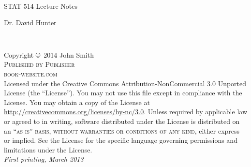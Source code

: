\documentclass[11pt,fleqn]{book} %
\begin{document}

\begingroup
\thispagestyle{empty}
\centering
\vspace*{9cm}
\par\normalfont\fontsize{35}{35}\sffamily\selectfont
STAT 514 Lecture Notes\par %
\vspace*{1cm}
{\Huge Dr. David Hunter}\par %
\endgroup


\newpage
~\vfill
\thispagestyle{empty}

\noindent Copyright \copyright\ 2014 John Smith\\ %

\noindent \textsc{Published by Publisher}\\ %

\noindent \textsc{book-website.com}\\ %

\noindent Licensed under the Creative Commons Attribution-NonCommercial 3.0 Unported License (the ``License''). You may not use this file except in compliance with the License. You may obtain a copy of the License at \url{http://creativecommons.org/licenses/by-nc/3.0}. Unless required by applicable law or agreed to in writing, software distributed under the License is distributed on an \textsc{``as is'' basis, without warranties or conditions of any kind}, either express or implied. See the License for the specific language governing permissions and limitations under the License.\\ %

\noindent \textit{First printing, March 2013} %


\end{document}
